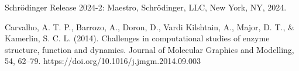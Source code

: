 \documentclass{article}
\begin{document}
\medskip




\begin{thebibliography}{9}

Schrödinger Release 2024-2: Maestro, Schrödinger, LLC, New York, NY, 2024.

Carvalho, A. T. P., Barrozo, A., Doron, D., Vardi Kilshtain, A., Major, D. T., & Kamerlin, S. C. L. (2014). Challenges in computational studies of enzyme structure, function and dynamics. Journal of Molecular Graphics and Modelling, 54, 62–79. https://doi.org/10.1016/j.jmgm.2014.09.003

\end{thebibliography}
\end{document}
